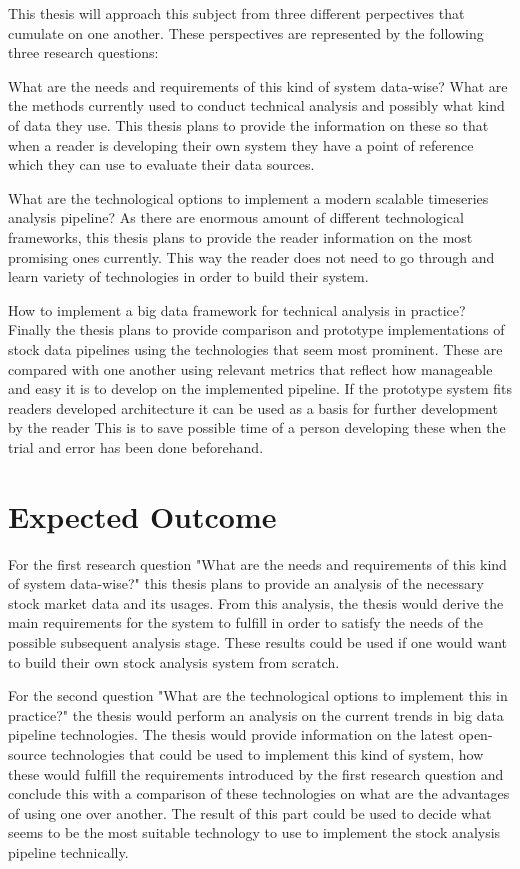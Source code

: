 This thesis will approach this subject from three different perpectives that cumulate on one another.
These perspectives are represented by the following three research questions:

What are the needs and requirements of this kind of system data-wise?
What are the methods currently used to conduct technical analysis and possibly what kind of data they use.
This thesis plans to provide the information on these so that when a reader is developing their own system they have a point of reference which they can use to evaluate their data sources.

What are the technological options to implement a modern scalable timeseries analysis pipeline?
As there are enormous amount of different technological frameworks, this thesis plans to provide the reader information on the most promising ones currently.
This way the reader does not need to go through and learn variety of technologies in order to build their system.

How to implement a big data framework for technical analysis in practice?
Finally the thesis plans to provide comparison and prototype implementations of stock data pipelines using the technologies that seem most prominent.
These are compared with one another using relevant metrics that reflect how manageable and easy it is to develop on the implemented pipeline.
If the prototype system fits readers developed architecture it can be used as a basis for further development by the reader
This is to save possible time of a person developing these when the trial and error has been done beforehand.

\section{Expected Outcome}

For the first research question "What are the needs and requirements of this kind of system data-wise?" this thesis plans to provide an analysis of the necessary stock market data and its usages.
From this analysis, the thesis would derive the main requirements for the system to fulfill in order to satisfy the needs of the possible subsequent analysis stage.
These results could be used if one would want to build their own stock analysis system from scratch.

For the second question "What are the technological options to implement this in practice?" the thesis would perform an analysis on the current trends in big data pipeline technologies.
The thesis would provide information on the latest open-source technologies that could be used to implement this kind of system, how these would fulfill the requirements introduced by the first research question and conclude this with a comparison of these technologies on what are the advantages of using one over another.
The result of this part could be used to decide what seems to be the most suitable technology to use to implement the stock analysis pipeline technically.

